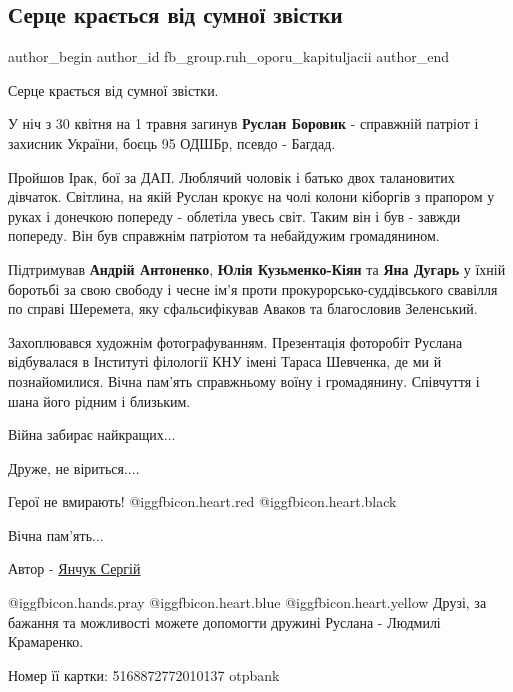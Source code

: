  
 
 
 
 
 
\subsection{Серце крається від сумної звістки}
\label{sec:01_05_2022.fb.fb_group.ruh_oporu_kapituljacii.1.smert_ruslan_borovik}
 
\ifcmt
 author_begin
   author_id fb_group.ruh_oporu_kapituljacii
 author_end
\fi

Серце крається від сумної звістки.

У ніч з 30 квітня на 1 травня загинув \textbf{Руслан Боровик} - справжній патріот і
захисник України, боєць 95 ОДШБр, псевдо - Багдад.

Пройшов Ірак, бої за ДАП. Люблячий чоловік і батько двох талановитих дівчаток.
Світлина, на якій Руслан крокує на чолі колони кіборгів з прапором у руках і
донечкою попереду - облетіла увесь світ. Таким він і був - завжди попереду. Він
був справжнім патріотом та небайдужим громадянином.

Підтримував \textbf{Андрій Антоненко}, \textbf{Юлія Кузьменко-Кіян} та \textbf{Яна Дугарь} у їхній
боротьбі за свою свободу і чесне ім'я проти прокурорсько-суддівського свавілля
по справі Шеремета, яку сфальсифікував Аваков та благословив Зеленський.

Захоплювався художнім фотографуванням. Презентація фоторобіт Руслана
відбувалася в Інституті філології КНУ імені Тараса Шевченка, де ми й
познайомилися. Вічна пам'ять справжньому воїну і громадянину. Співчуття і шана
його рідним і близьким.

Війна забирає найкращих...

Друже, не віриться....

Герої не вмирають! @igg{fbicon.heart.red}  @igg{fbicon.heart.black} 

Вічна пам'ять...

Автор - \href{https://www.facebook.com/SerhiyYanchuk}{Янчук Сергій}

@igg{fbicon.hands.pray}  @igg{fbicon.heart.blue}  @igg{fbicon.heart.yellow}
Друзі, за бажання та можливості можете допомогти дружині Руслана - Людмилі
Крамаренко.

Номер її картки: 5168872772010137 otpbank
